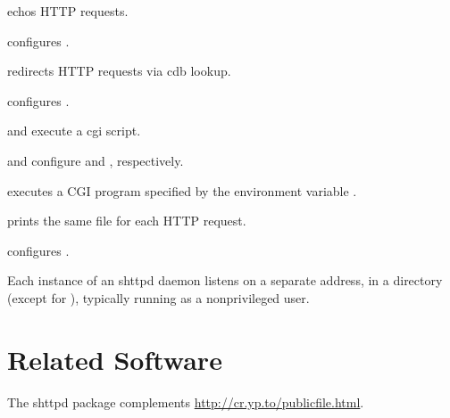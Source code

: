  echos HTTP requests.

 configures .

 redirects HTTP requests via cdb lookup.

 configures .

 and  execute a cgi script.

 and  configure  and
, respectively.

 executes a CGI program specified by the environment variable
.

 prints the same file for each HTTP request.

 configures .

Each instance of an shttpd daemon listens on a separate address, in a
 directory (except for ), typically running as a
nonprivileged user.

\section{Related Software}
The shttpd package complements \href{publicfile}{http://cr.yp.to/publicfile.html}.

